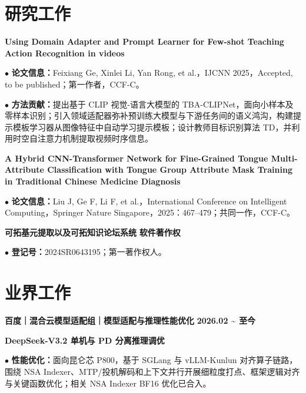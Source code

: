\documentclass[11pt,a4paper,fontset=none]{ctexart}
\newcommand{\daterange}[1]{{\textbf{#1}}}
\newcommand{\entrytitle}[1]{{\textbf{#1}}}
\begin{document}
\section*{研究工作}
\vspace{-0.1em}

\noindent
\entrytitle{Using Domain Adapter and Prompt Learner for Few-shot Teaching Action Recognition in videos}

\par\noindent
$\bullet$ \textbf{论文信息：}Feixiang Ge, Xinlei Li, Yan Rong, et al.，IJCNN 2025，Accepted, to be published；第一作者，CCF-C。

\par\noindent
$\bullet$ \textbf{方法贡献：}提出基于 CLIP 视觉-语言大模型的 TBA-CLIPNet，面向小样本及零样本识别；引入领域适配器弥补预训练大模型与下游任务间的语义鸿沟，构建提示模板学习器从图像特征中自动学习提示模板；设计教师目标识别算法 TD，并利用时空自注意力机制提取视频时序信息。

\par\noindent
\entrytitle{A Hybrid CNN-Transformer Network for Fine-Grained Tongue Multi-Attribute Classification with Tongue Group Attribute Mask Training in Traditional Chinese Medicine Diagnosis}

\par\noindent
$\bullet$ \textbf{论文信息：}Liu J, Ge F, Li F, et al.，International Conference on Intelligent Computing，Springer Nature Singapore，2025：467--479；共同一作，CCF-C。

\par\noindent
\entrytitle{可拓基元提取以及可拓知识论坛系统}
\hfill\daterange{软件著作权}

\par\noindent
$\bullet$ \textbf{登记号：}2024SR0643195；第一著作权人。

\section*{业界工作}
\vspace{-0.1em}

\noindent
\entrytitle{百度｜混合云模型适配组｜模型适配与推理性能优化}
\hfill\daterange{2026.02 \textasciitilde{} 至今}

\par\noindent
\entrytitle{DeepSeek-V3.2 单机与 PD 分离推理调优}

\par\noindent
$\bullet$ \textbf{性能优化：}面向昆仑芯 P800，基于 SGLang 与 vLLM-Kunlun 对齐算子链路，围绕 NSA Indexer、MTP/投机解码和上下文并行开展细粒度打点、框架逻辑对齐与关键函数优化；相关 NSA Indexer BF16 优化已合入。
\end{document}
